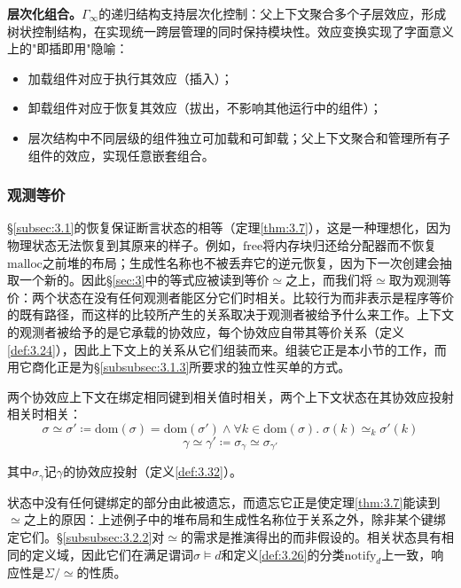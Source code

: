 \textbf{层次化组合。}$\Gamma_\infty$的递归结构支持层次化控制：父上下文聚合多个子层效应，形成树状控制结构，在实现统一跨层管理的同时保持模块性。效应变换实现了字面意义上的"即插即用"隐喻：
\begin{itemize}
\item 加载组件对应于执行其效应（插入）；
\item 卸载组件对应于恢复其效应（拔出，不影响其他运行中的组件）；
\item 层次结构中不同层级的组件独立可加载和可卸载；父上下文聚合和管理所有子组件的效应，实现任意嵌套组合。
\end{itemize}

\subsubsection{观测等价}\label{subsubsec:3.3.2}

\S\ref{subsec:3.1}的恢复保证断言状态的相等（定理\ref{thm:3.7}），这是一种理想化，因为物理状态无法恢复到其原来的样子。例如，$\mathrm{free}$将内存块归还给分配器而不恢复$\mathrm{malloc}$之前堆的布局；生成性名称也不被丢弃它的逆元恢复，因为下一次创建会抽取一个新的\cite{ref39}。因此\S\ref{sec:3}中的等式应被读到等价$\simeq$之上，而我们将$\simeq$取为观测等价：两个状态在没有任何观测者能区分它们时相关。比较行为而非表示是程序等价的既有路径\cite{ref40}，而这样的比较所产生的关系取决于观测者被给予什么来工作\cite{ref41}。上下文的观测者被给予的是它承载的协效应，每个协效应自带其等价关系（定义\ref{def:3.24}），因此上下文上的关系从它们组装而来。组装它正是本小节的工作，而用它商化正是为\S\ref{subsubsec:3.1.3}所要求的独立性买单的方式。

\begin{definition}\label{def:3.33}
两个协效应上下文在绑定相同键到相关值时相关，两个上下文状态在其协效应投射相关时相关：
\begin{equation}\label{eq:3.32}
\sigma \simeq \sigma' \coloneqq \mathrm{dom}(\sigma) = \mathrm{dom}(\sigma') \wedge \forall k \in \mathrm{dom}(\sigma).\; \sigma(k) \simeq_k \sigma'(k)
\end{equation}
\[
\gamma \simeq \gamma' \coloneqq \sigma_\gamma \simeq \sigma_{\gamma'}
\]
\end{definition}

其中$\sigma_\gamma$记$\gamma$的协效应投射（定义\ref{def:3.32}）。

状态中没有任何键绑定的部分由此被遗忘，而遗忘它正是使定理\ref{thm:3.7}能读到$\simeq$之上的原因：上述例子中的堆布局和生成性名称位于关系之外，除非某个键绑定它们。\S\ref{subsubsec:3.2.2}对$\simeq$的需求是推演得出的而非假设的。相关状态具有相同的定义域，因此它们在满足谓词$\sigma \models d$和定义\ref{def:3.26}的分类$\mathrm{notify}_d$上一致，响应性是$\Sigma / \simeq$的性质。

